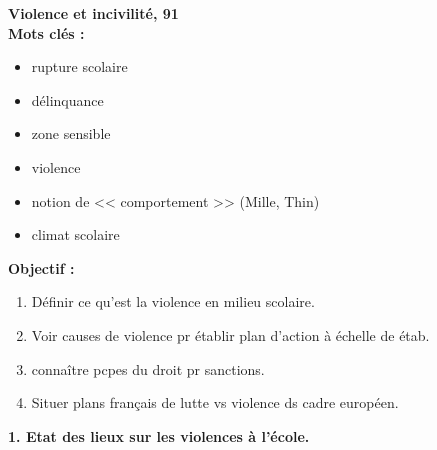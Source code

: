 \documentclass[12pt]{article}
\begin{document}
\textbf{Violence  et incivilité, 91} \\

\textbf{Mots clés : }
\begin{itemize}
\item rupture scolaire
\item délinquance
\item zone sensible
\item violence
\item notion de << comportement >> (Mille, Thin)
\item climat scolaire
\end{itemize}

\vspace{0.5cm}

\textbf{Objectif :}


\begin{enumerate}
\item Définir ce qu'est la violence en milieu scolaire.\\
\item Voir causes de violence pr établir plan d'action à échelle de étab.\\
\item connaître pcpes du droit pr sanctions. \\
\item Situer plans français de lutte vs violence ds cadre européen.\\
\end{enumerate}

\textbf{1. Etat des lieux sur les violences à l'école.}
\end{document}
